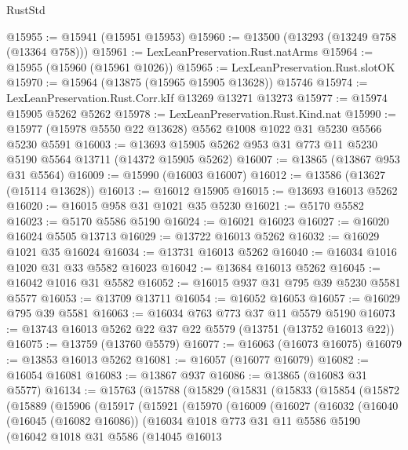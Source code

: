 \begin{lexlean}{RustStd}
\begin{coremodule}
@15955 := @15941 (@15951 @15953)
@15960 := @13500 (@13293 (@13249 @758 (@13364 @758)))
@15961 := LexLeanPreservation.Rust.natArms
@15964 := @15955 (@15960 (@15961 @1026))
@15965 := LexLeanPreservation.Rust.slotOK
@15970 := @15964 (@13875 (@15965 @15905 @13628)) @15746
@15974 := LexLeanPreservation.Rust.Corr.kIf @13269 @13271 @13273
@15977 := @15974 @15905 @5262 @5262
@15978 := LexLeanPreservation.Rust.Kind.nat
@15990 := @15977 (@15978 @5550 @22 @13628) @5562 @1008 @1022 @31 @5230 @5566 @5230 @5591
@16003 := @13693 @15905 @5262 @953 @31 @773 @11 @5230 @5190 @5564 @13711 (@14372 @15905 @5262)
@16007 := @13865 (@13867 @953 @31 @5564)
@16009 := @15990 (@16003 @16007)
@16012 := @13586 (@13627 (@15114 @13628))
@16013 := @16012 @15905
@16015 := @13693 @16013 @5262
@16020 := @16015 @958 @31 @1021 @35 @5230
@16021 := @5170 @5582
@16023 := @5170 @5586 @5190
@16024 := @16021 @16023
@16027 := @16020 @16024 @5505 @13713
@16029 := @13722 @16013 @5262
@16032 := @16029 @1021 @35 @16024
@16034 := @13731 @16013 @5262
@16040 := @16034 @1016 @1020 @31 @33 @5582 @16023
@16042 := @13684 @16013 @5262
@16045 := @16042 @1016 @31 @5582
@16052 := @16015 @937 @31 @795 @39 @5230 @5581 @5577
@16053 := @13709 @13711
@16054 := @16052 @16053
@16057 := @16029 @795 @39 @5581
@16063 := @16034 @763 @773 @37 @11 @5579 @5190
@16073 := @13743 @16013 @5262 @22 @37 @22 @5579 (@13751 (@13752 @16013 @22))
@16075 := @13759 (@13760 @5579)
@16077 := @16063 (@16073 @16075)
@16079 := @13853 @16013 @5262
@16081 := @16057 (@16077 @16079)
@16082 := @16054 @16081
@16083 := @13867 @937
@16086 := @13865 (@16083 @31 @5577)
@16134 := @15763
    (@15788
      (@15829
        (@15831
          (@15833
            (@15854
              (@15872
                (@15889
                  (@15906
                    (@15917
                      (@15921
                        (@15970
                          (@16009
                            (@16027
                              (@16032
                                (@16040
                                  (@16045 (@16082 @16086))
                                  (@16034
                                    @1018
                                    @773
                                    @31
                                    @11
                                    @5586
                                    @5190
                                    (@16042
                                      @1018
                                      @31
                                      @5586
                                      (@14045
                                        @16013

\end{coremodule}
\end{lexlean}
